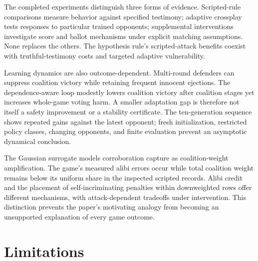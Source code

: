 \documentclass[
  12pt,
]{article}
\begin{document}
The completed experiments distinguish three forms of evidence.
Scripted-rule comparisons measure behavior against specified testimony;
adaptive crossplay tests responses to particular trained opponents;
supplemental interventions investigate score and ballot mechanisms under
explicit matching assumptions. None replaces the others. The hypothesis
rule's scripted-attack benefits coexist with truthful-testimony costs
and targeted adaptive vulnerability.

Learning dynamics are also outcome-dependent. Multi-round defenders can
suppress coalition victory while retaining frequent innocent ejections.
The dependence-aware loop modestly lowers coalition victory after
coalition stages yet increases whole-game voting harm. A smaller
adaptation gap is therefore not itself a safety improvement or a
stability certificate. The ten-generation sequence shows repeated gains
against the latest opponent; fresh initialization, restricted policy
classes, changing opponents, and finite evaluation prevent an asymptotic
dynamical conclusion.

The Gaussian surrogate models corroboration capture as coalition-weight
amplification. The game's measured alibi errors occur while total
coalition weight remains below its uniform share in the inspected
scripted records. Alibi credit and the placement of self-incriminating
penalties within downweighted rows offer different mechanisms, with
attack-dependent tradeoffs under intervention. This distinction prevents
the paper's motivating analogy from becoming an unsupported explanation
of every game outcome.

\FloatBarrier

\section{Limitations}\label{limitations}
\end{document}
